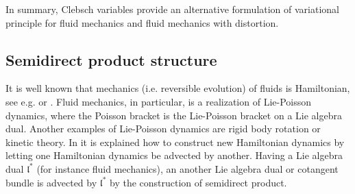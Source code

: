 \documentclass[
10pt, %
a4paper, %
oneside, %
headinclude,footinclude, %
BCOR5mm, %
]{scrartcl}
\newcommand{\IP}[1]{{\color{Red}IP:\ \ #1}}
\newcommand{\VK}[1]{{\color{Cyan}VK:\ \ #1}}
\newcommand{\LA}{\mathfrak{l}}
\begin{document}
In summary, Clebsch variables provide an alternative formulation of variational principle for fluid mechanics and fluid mechanics with distortion.

\subsection{Semidirect product structure}\label{sec.SP}
It is well known that mechanics (i.e. reversible evolution) of fluids is Hamiltonian, see e.g. 
\cite{Arnold,Marsden-Ratiu-Weinstein} or \cite{PKG}. Fluid mechanics, in particular, is a 
realization of Lie-Poisson dynamics, where the Poisson bracket is the Lie-Poisson bracket on a Lie 
algebra dual. Another examples of Lie-Poisson dynamics are rigid body rotation or kinetic theory. 
In \cite{Marsden-Ratiu-Weinstein} it is explained how to construct new Hamiltonian dynamics by 
letting one Hamiltonian dynamics be advected by another. Having a Lie algebra dual $\LA^*$ (for 
instance fluid mechanics), an another Lie algebra dual or cotangent bundle is advected by $\LA^*$ 
by the construction of semidirect product. 
\end{document}
